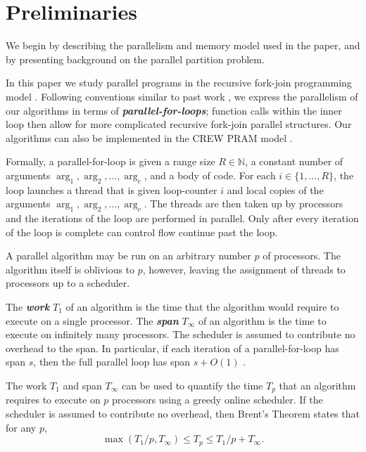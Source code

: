 \documentclass[11pt]{article}
\newcommand{\defn}[1]{{\textit{\textbf{\boldmath #1}}}}
\renewcommand{\paragraph}[1]{\vspace{0.09in}\noindent{\bf \boldmath #1.}}
\theoremstyle{remark}
\theoremstyle{remark}
\begin{document}
\section{Preliminaries}\label{secprelim}

We begin by describing the parallelism and memory model used in
the paper, and by presenting background on the parallel partition problem.

\paragraph{Fork-Join Parallelism} In this paper we study parallel programs
in the recursive fork-join programming model \cite{BlumofeLe99,
  FrigoLeRa98, AroraBlPl98, BlumofeJo96, CLRS, FengLe99, Cilkmem,
  ForkJoin1, Forkjoin2}. Following conventions similar to past work
\cite{Blelloch96,AcarBl16,CLRS}, we express the parallelism of our
algorithms in terms of \defn{parallel-for-loops}; function calls
within the inner loop then allow for more complicated recursive
fork-join parallel structures. Our algorithms can also be implemented
in the CREW PRAM model \cite{Blelloch96, AcarBl16}.

Formally, a parallel-for-loop is given a range size $R \in \mathbb{N}$, a
constant number of arguments $\arg_1, \arg_2, \ldots, \arg_c$, and a
body of code. For each $i \in \{1, \ldots, R\}$, the loop launches a
thread that is given loop-counter $i$ and local copies of the
arguments $\arg_1, \arg_2, \ldots, \arg_c$. The threads are then taken up by
processors and the iterations of the loop are performed in parallel. Only after
every iteration of the loop is complete can control flow continue past the
loop.

A parallel algorithm may be run on an arbitrary number $p$ of
processors. The algorithm itself is oblivious to $p$, however, leaving
the assignment of threads to processors up to a scheduler.

The \defn{work} $T_1$ of an algorithm is the time that the algorithm
would require to execute on a single processor. The \defn{span}
$T_\infty$ of an algorithm is the time to execute on infinitely many
processors. The scheduler is assumed to contribute no overhead to the
span. In particular, if each iteration of a
parallel-for-loop has span $s$, then the full parallel loop has span
$s + O(1)$ \cite{Blelloch96,AcarBl16}.

The work $T_1$ and span $T_\infty$ can be used to quantify the time $T_p$
that an algorithm requires to execute on $p$ processors using a greedy
online scheduler. If the scheduler is assumed to contribute no
overhead, then Brent's Theorem \cite{Brent74} states that for any
$p$,
$$\max(T_1 / p, T_\infty) \le T_p \le T_1 / p + T_\infty.$$
\end{document}
